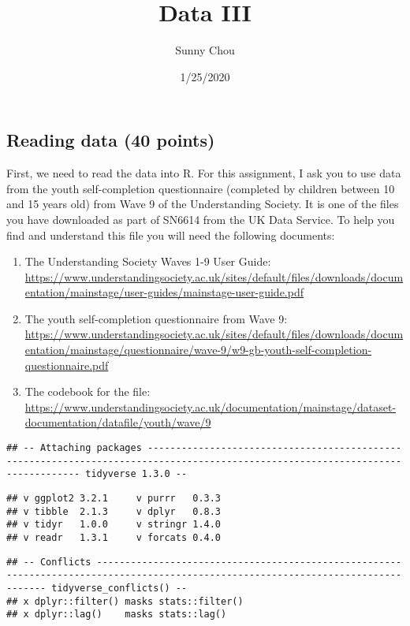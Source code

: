 \documentclass[
]{article}
\title{Data III}
\author{Sunny Chou}
\date{1/25/2020}
\providecommand{\tightlist}{%
  \setlength{\itemsep}{0pt}\setlength{\parskip}{0pt}}
\begin{document}
\maketitle

\hypertarget{reading-data-40-points}{%
\subsection{Reading data (40 points)}\label{reading-data-40-points}}

First, we need to read the data into R. For this assignment, I ask you
to use data from the youth self-completion questionnaire (completed by
children between 10 and 15 years old) from Wave 9 of the Understanding
Society. It is one of the files you have downloaded as part of SN6614
from the UK Data Service. To help you find and understand this file you
will need the following documents:

\begin{enumerate}
\def\labelenumi{\arabic{enumi})}
\tightlist
\item
  The Understanding Society Waves 1-9 User Guide:
  \url{https://www.understandingsociety.ac.uk/sites/default/files/downloads/documentation/mainstage/user-guides/mainstage-user-guide.pdf}
\item
  The youth self-completion questionnaire from Wave 9:
  \url{https://www.understandingsociety.ac.uk/sites/default/files/downloads/documentation/mainstage/questionnaire/wave-9/w9-gb-youth-self-completion-questionnaire.pdf}
\item
  The codebook for the file:
  \url{https://www.understandingsociety.ac.uk/documentation/mainstage/dataset-documentation/datafile/youth/wave/9}
\end{enumerate}

\begin{verbatim}
## -- Attaching packages -------------------------------------------------------------------------------------------------------------------------------- tidyverse 1.3.0 --
\end{verbatim}

\begin{verbatim}
## v ggplot2 3.2.1     v purrr   0.3.3
## v tibble  2.1.3     v dplyr   0.8.3
## v tidyr   1.0.0     v stringr 1.4.0
## v readr   1.3.1     v forcats 0.4.0
\end{verbatim}

\begin{verbatim}
## -- Conflicts ----------------------------------------------------------------------------------------------------------------------------------- tidyverse_conflicts() --
## x dplyr::filter() masks stats::filter()
## x dplyr::lag()    masks stats::lag()
\end{verbatim}
\end{document}
